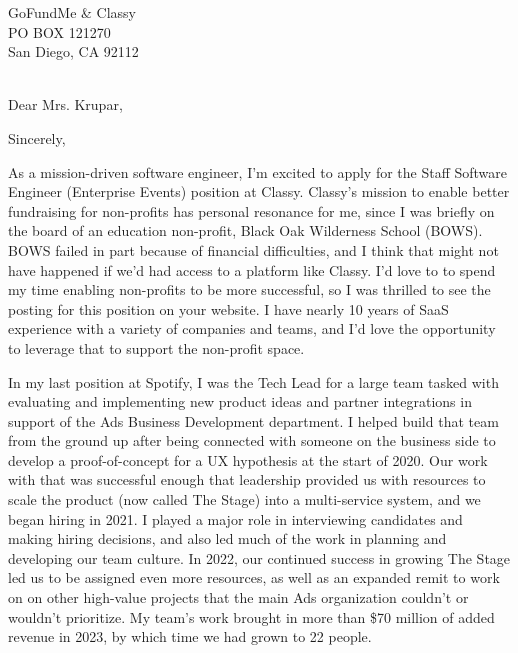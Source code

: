 

	{GoFundMe \& Classy
	\\PO BOX 121270
	\\San Diego, CA 92112}

\date{April 17, 2024}
\opening{\\Dear Mrs. Krupar,}
\closing{Sincerely,}
\makelettertitle


As a mission-driven software engineer, I'm excited to apply for the Staff Software Engineer (Enterprise Events) position at Classy.
Classy's mission to enable better fundraising for non-profits has personal resonance for me, since I was briefly on the board of an
education non-profit, Black Oak Wilderness School (BOWS). BOWS failed in part because of financial difficulties,
and I think that might not have happened if we'd had access to a platform like Classy. I'd love to to spend my time
enabling non-profits to be more successful, so I was thrilled to see the posting for this position on your website.
I have nearly 10 years of SaaS experience with a variety of companies and teams,
and I'd love the opportunity to leverage that to support the non-profit space.

In my last position at Spotify, I was the Tech Lead for a large team tasked with evaluating and implementing new product ideas
and partner integrations in support of the Ads Business Development department.
I helped build that team from the ground up after being connected with someone on the business side to develop a proof-of-concept
for a UX hypothesis at the start of 2020. Our work with that was successful enough that leadership provided us with resources
to scale the product (now called The Stage) into a multi-service system, and we began hiring in 2021.
I played a major role in interviewing candidates and making hiring decisions,
and also led much of the work in planning and developing our team culture.
In 2022, our continued success in growing The Stage led us to be assigned even more resources,
as well as an expanded remit to work on on other high-value projects that the main Ads organization couldn't or wouldn't prioritize.
My team's work brought in more than \$70 million of added revenue in 2023, by which time we had grown to 22 people.

